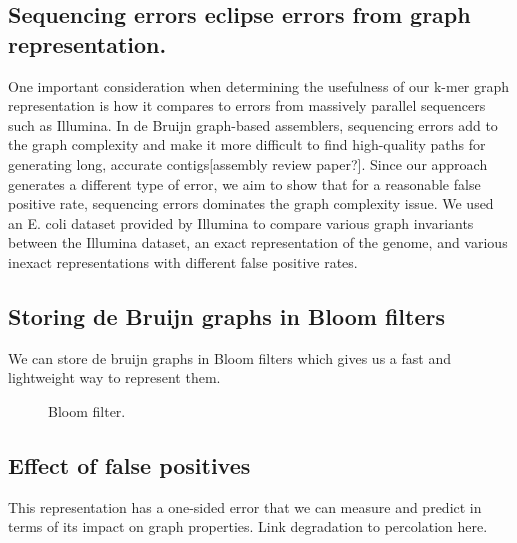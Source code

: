 \documentclass[12pt]{article} \usepackage{simplemargins}
\begin{document}
\subsection{Sequencing errors eclipse errors from graph representation.} One
important consideration when determining the usefulness of our k-mer
graph representation is how it compares to errors from massively
parallel sequencers such as Illumina. In de Bruijn graph-based
assemblers, sequencing errors add to the graph complexity and make it
more difficult to find high-quality paths for generating long,
accurate contigs[assembly review paper?]. Since our approach generates
a different type of error, we aim to show that for a reasonable false
positive rate, sequencing errors dominates the graph complexity
issue. We used an E. coli dataset provided by Illumina to compare
various graph invariants between the Illumina dataset, an exact
representation of the genome, and various inexact representations with
different false positive rates.

\subsection{Storing de Bruijn graphs in Bloom filters}

We can store de bruijn graphs in Bloom filters which gives us a fast and lightweight way to represent them.

\begin{figure}
\caption{Bloom filter.}
\end{figure}

\subsection{Effect of false positives}

This representation has a one-sided error that we can measure and
predict in terms of its impact on graph properties.  Link degradation
to percolation here.
\end{document}
